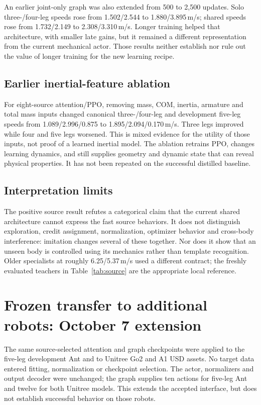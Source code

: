 \documentclass[11pt,letterpaper]{article}
\begin{document}
An earlier joint-only graph was also extended from 500 to 2,500 updates. Solo
three-/four-leg speeds rose from 1.502/2.544 to 1.880/3.895\,m/s; shared speeds
rose from 1.732/2.149 to 2.308/3.310\,m/s. Longer training helped that architecture,
with smaller late gains, but it remained a different representation from the
current mechanical actor. Those results neither establish nor rule out the value
of longer training for the new learning recipe.

\subsection{Earlier inertial-feature ablation}
For eight-source attention/PPO, removing mass, COM, inertia, armature and total
mass inputs changed canonical three-/four-leg and development five-leg speeds
from 1.089/2.996/0.875 to 1.895/2.094/0.170\,m/s. Three legs improved while four
and five legs worsened. This is mixed evidence for the utility of those inputs,
not proof of a learned inertial model. The ablation retrains PPO, changes learning
dynamics, and still supplies geometry and dynamic state that can reveal physical
properties. It has not been repeated on the successful distilled baseline.

\subsection{Interpretation limits}
The positive source result refutes a categorical claim that the current shared
architecture cannot express the fast source behaviors. It does not distinguish
exploration, credit assignment, normalization, optimizer behavior and cross-body
interference: imitation changes several of these together. Nor does it show that
an unseen body is controlled using its mechanics rather than template recognition.
Older specialists at roughly 6.25/5.37\,m/s used a different contract; the freshly
evaluated teachers in Table~\ref{tab:source} are the appropriate local reference.

\section{Frozen transfer to additional robots: October 7 extension}
\label{sec:transfer}

The same source-selected attention and graph checkpoints were applied to the
five-leg development Ant and to Unitree Go2 and A1 USD assets. No target data
entered fitting, normalization or checkpoint selection. The actor, normalizers
and output decoder were unchanged; the graph supplies ten actions for five-leg
Ant and twelve for both Unitree models. This extends the accepted interface,
but does not establish successful behavior on those robots.
\end{document}
